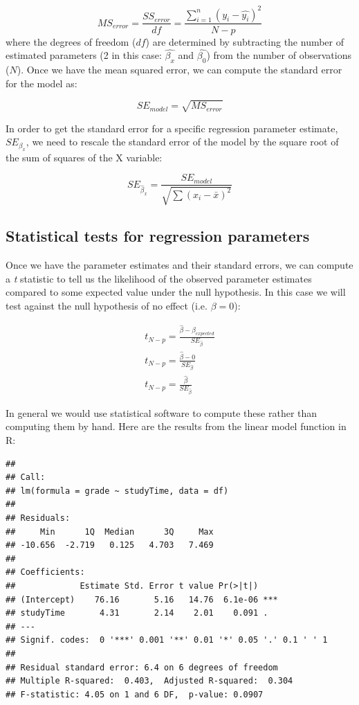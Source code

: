 \documentclass[12pt,]{book}
\theoremstyle{definition}
\theoremstyle{definition}
\theoremstyle{definition}
\theoremstyle{remark}
\begin{document}
\[
MS_{error} = \frac{SS_{error}}{df} = \frac{\sum_{i=1}^n{(y_i - \hat{y_i})^2} }{N - p}
\]
where the degrees of freedom (\(df\)) are determined by subtracting the number of estimated parameters (2 in this case: \(\hat{\beta_x}\) and \(\hat{\beta_0}\)) from the number of observations (\(N\)). Once we have the mean squared error, we can compute the standard error for the model as:

\[
SE_{model} = \sqrt{MS_{error}}
\]

In order to get the standard error for a specific regression parameter estimate, \(SE_{\beta_x}\), we need to rescale the standard error of the model by the square root of the sum of squares of the X variable:

\[
SE_{\hat{\beta}_x} = \frac{SE_{model}}{\sqrt{{\sum{(x_i - \bar{x})^2}}}}
\]

\hypertarget{statistical-tests-for-regression-parameters}{%
\subsection{Statistical tests for regression parameters}\label{statistical-tests-for-regression-parameters}}

Once we have the parameter estimates and their standard errors, we can compute a \emph{t} statistic to tell us the likelihood of the observed parameter estimates compared to some expected value under the null hypothesis. In this case we will test against the null hypothesis of no effect (i.e. \(\beta=0\)):

\[
\begin{array}{c}
t_{N - p} = \frac{\hat{\beta} - \beta_{expected}}{SE_{\hat{\beta}}}\\
t_{N - p} = \frac{\hat{\beta} - 0}{SE_{\hat{\beta}}}\\
t_{N - p} = \frac{\hat{\beta} }{SE_{\hat{\beta}}}
\end{array}
\]

In general we would use statistical software to compute these rather than computing them by hand. Here are the results from the linear model function in R:

\begin{verbatim}
## 
## Call:
## lm(formula = grade ~ studyTime, data = df)
## 
## Residuals:
##     Min      1Q  Median      3Q     Max 
## -10.656  -2.719   0.125   4.703   7.469 
## 
## Coefficients:
##             Estimate Std. Error t value Pr(>|t|)    
## (Intercept)    76.16       5.16   14.76  6.1e-06 ***
## studyTime       4.31       2.14    2.01    0.091 .  
## ---
## Signif. codes:  0 '***' 0.001 '**' 0.01 '*' 0.05 '.' 0.1 ' ' 1
## 
## Residual standard error: 6.4 on 6 degrees of freedom
## Multiple R-squared:  0.403,  Adjusted R-squared:  0.304 
## F-statistic: 4.05 on 1 and 6 DF,  p-value: 0.0907
\end{verbatim}
\end{document}
